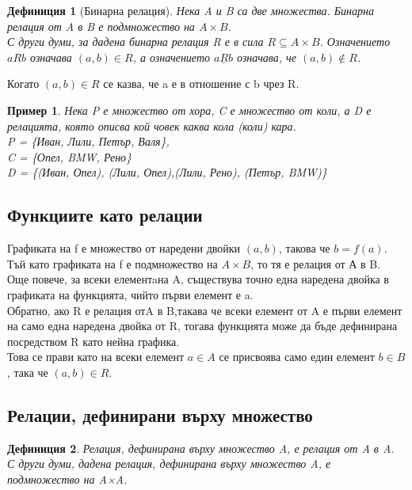\documentclass[fleqn, 12pt]{article}
\newtheorem{example}{Пример}[subsection]
\newtheorem{definition}{Дефиниция}[subsection]
\begin{document}
\begin{definition}[Бинарна релация]
Нека A и B са две множества. Бинарна релация от A в B е подмножество на $A \times B$. \\
С други думи, за дадена бинарна релация R е в сила $R \subseteq A \times B$.
Означението $aRb$ означава $(a, b) \in R$, а означението $a \underline{R} b$ означава, че $(a, b) \notin R$.
\end{definition}
Когато  $(a, b) \in R$ се казва, че a е в отношение с b чрез R.\\

\begin{example}
Нека P е множество от хора, C е множество от коли, а D е релацията, която описва кой човек каква кола (коли) кара.\\
P = \{Иван, Лили, Петър, Валя\},\\
C = \{Опел, BMW, Рено\}\\
D = \{(Иван, Опел), (Лили, Опел),(Лили, Рено), (Петър, BMW)\}
\end{example}

\subsection{Функциите като релации}
Графиката на f е множество от наредени двойки $(a, b)$, такова че $b = f(a)$.\\
Тъй като графиката на f е подмножество на $A \times B$, то тя е релация от А в B. \\
Още повече, за всеки елементaна A, съществува точно една наредена двойка в графиката на функцията, чийто първи елемент е a.\\
Обратно, ако R е релация отA в B,такава че всеки елемент от A е първи елемент на само една наредена двойка от R, тогава функцията може да бъде дефинирана посредством R като нейна графика. \\
Това се прави като на всеки елемент $a \in A$ се присвоява само един елемент $b \in B$, така че $(a, b) \in R$.

\subsection{Релации, дефинирани върху множество}

\begin{definition}
Релация, дефинирана върху множество A, е релация от A в A.\\
С други думи, дадена релация, дефинирана върху множество A, е подмножество на A×A.
\end{definition}
\end{document}

